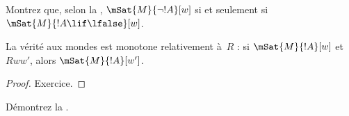 \documentclass[../../../include/open-logic-section]{subfiles}
\begin{document}
\begin{prob}
  Montrez que, selon la ,
  $\mSat{M}{\lnot !A}[w]$ si et seulement si
  $\mSat{M}{!A \lif \lfalse}[w]$.
\end{prob}

\begin{prop}
  La vérité aux mondes est monotone relativement à~$R$ : si
  $\mSat{M}{!A}[w]$ et $Rww'$, alors $\mSat{M}{!A}[w']$.
\end{prop}

\begin{proof}
  Exercice.
\end{proof}

\begin{prob}
  Démontrez la .
\end{prob}
\end{document}
